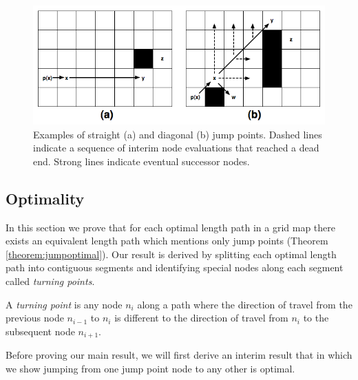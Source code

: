\begin{figure}[tb]
       \begin{center}
		   \includegraphics[scale=0.35, trim = 10mm 10mm 10mm 0mm]
			{diagrams/jumppoints.png}
       \end{center}
	\vspace{-3pt}
       \caption{Examples of straight (a) and diagonal (b) jump points.
Dashed lines indicate a sequence of interim node evaluations that reached
a dead end. Strong lines indicate eventual successor nodes.}
       \label{fig:jumppoints}
\end{figure}

\subsection{Optimality}
In this section we prove that for each optimal length path in a grid map there
exists an equivalent length path which mentions only jump points (Theorem
\ref{theorem:jumpoptimal}).  Our result is derived by splitting each optimal 
length path into contiguous segments and identifying special nodes along each segment 
called \emph{turning points}.

\begin{definition}
A \emph{turning point} is any node $n_{i}$ along a path where the direction of
travel from the previous node $n_{i-1}$ to $n_{i}$ is different to the direction
of travel from $n_{i}$ to the subsequent node $n_{i+1}$.
\end{definition}

Before proving our main result, we will first derive an interim result that
in which we show jumping from one jump point node to any other is optimal.

